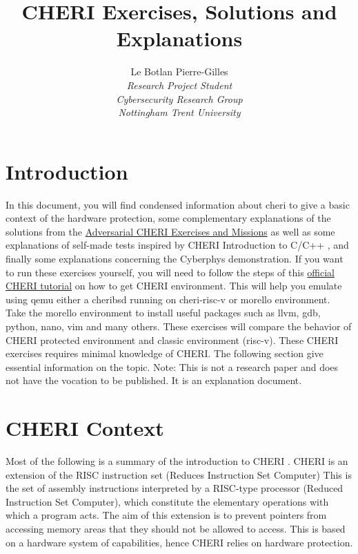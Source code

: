 \documentclass[a4paper, 11pt]{article}
\title{CHERI Exercises, Solutions and Explanations}
\author{Le Botlan Pierre-Gilles \\\textit{Research Project Student} \\ \textit{Cybersecurity Research Group} \\ \textit{Nottingham Trent University} }
\begin{document}
\maketitle
\tableofcontents
{}

\section{Introduction}
In this document, you will find condensed information about \Gls{cheri} to give a basic context of the hardware protection, some complementary explanations of the solutions from the \href{https://ctsrd-cheri.github.io/cheri-exercises/cover/index.html}{Adversarial CHERI Exercises and Missions} as well as some explanations of self-made tests inspired by CHERI Introduction to C/C++ \cite{watson2020cheri}, and finally some explanations concerning the Cyberphys demonstration. 
If you want to run these exercises yourself, you will need to follow the steps of this \href{https://ctsrd-cheri.github.io/cheri-faq/#how-can-i-emulate-a-cheri-enabled-environment}{official CHERI tutorial} on how to get CHERI environment. This will help you emulate using \Gls{qemu} either a \Gls{cheribsd} running on \Gls{cheri-risc-v} or \Gls{morello} environment. Take the \Gls{morello} environment to install useful packages such as llvm, gdb, python, nano, vim and many others.
These exercises will compare the behavior of CHERI protected environment and classic environment (\Gls{risc-v}). These CHERI exercises requires minimal knowledge of CHERI. The following section give essential information on the topic.
Note: This is not a research paper and does not have the vocation to be published. It is an explanation document.

\printnoidxglossaries


\section{CHERI Context}
Most of the following is a summary of the introduction to CHERI \cite{watson2019introduction}.
CHERI is an extension of the RISC instruction set (Reduces Instruction Set Computer)
This is the set of assembly instructions interpreted by a RISC-type processor (Reduced Instruction Set Computer), which constitute the elementary operations with which a program acts.
The aim of this extension is to prevent pointers from accessing memory areas that they should not be allowed to access. This is based on a hardware system of capabilities, hence CHERI relies on hardware protection.
\end{document}
